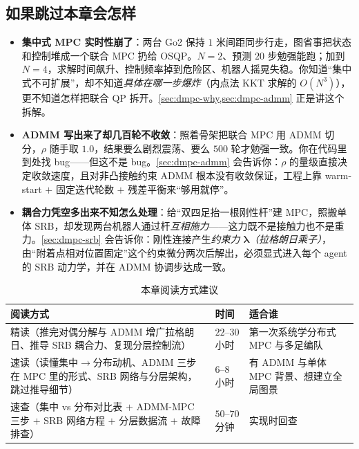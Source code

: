\subsection*{如果跳过本章会怎样}
\begin{itemize}
  \item \textbf{集中式 MPC 实时性崩了}：两台 Go2 保持 $1$ 米间距同步行走，图省事把状态和控制堆成一个联合 MPC 扔给 OSQP。$N=2$、预测 $20$ 步勉强能跑；加到 $N=4$，求解时间飙升、控制频率掉到危险区、机器人摇晃失稳。你知道“集中式不可扩展”，却不知道\emph{具体在哪一步爆炸}（内点法 KKT 求解的 $O(N^3)$），更不知道怎样把联合 QP 拆开。\cref{sec:dmpc-why,sec:dmpc-admm} 正是讲这个拆解。
  \item \textbf{ADMM 写出来了却几百轮不收敛}：照着骨架把联合 MPC 用 ADMM 切分，$\rho$ 随手取 $1.0$，结果要么剧烈震荡、要么 $500$ 轮才勉强一致。你在代码里到处找 bug——但这不是 bug。\cref{sec:dmpc-admm} 会告诉你：$\rho$ 的量级直接决定收敛速度，且对非凸接触约束 ADMM 根本没有收敛保证，工程上靠 warm-start $+$ 固定迭代轮数 $+$ 残差平衡来“够用就停”。
  \item \textbf{耦合力凭空多出来不知怎么处理}：给“双四足抬一根刚性杆”建 MPC，照搬单体 SRB，却发现两台机器人通过杆\emph{互相施力}——这力既不是接触力也不是重力。\cref{sec:dmpc-srb} 会告诉你：刚性连接产生\emph{约束力 $\boldsymbol{\lambda}$（拉格朗日乘子）}，由“附着点相对位置固定”这个约束微分两次后解出，必须显式进入每个 agent 的 SRB 动力学，并在 ADMM 协调步达成一致。
\end{itemize}

\begin{table}[H]\centering\small
\caption{本章阅读方式建议}
\label{tab:dmpc-reading}
\begin{tabularx}{\linewidth}{LlL}
\toprule
阅读方式 & 时间 & 适合谁 \\
\midrule
精读（推完对偶分解与 ADMM 增广拉格朗日、推导 SRB 耦合力、复现分层控制流） & $22$--$30$ 小时 & 第一次系统学分布式 MPC 与多足编队 \\
速读（读懂集中$\to$分布动机、ADMM 三步在 MPC 里的形式、SRB 网络与分层架构，跳过推导细节） & $6$--$8$ 小时 & 有 ADMM 与单体 MPC 背景、想建立全局图景 \\
速查（集中 vs 分布对比表 $+$ ADMM-MPC 三步 $+$ SRB 网络方程 $+$ 分层数据流 $+$ 故障排查） & $50$--$70$ 分钟 & 实现时回查 \\
\bottomrule
\end{tabularx}
\end{table}

